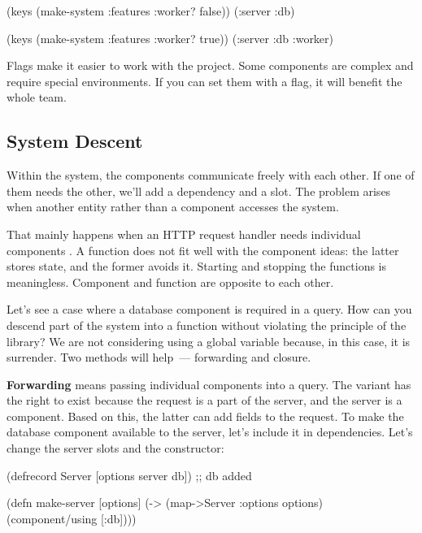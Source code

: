 \else

\begin{english}
  \begin{clojure}
(keys (make-system {:features {:worker? false}}))
(:server :db)

(keys (make-system {:features {:worker? true}}))
(:server :db :worker)
  \end{clojure}
\end{english}

\fi

Flags make it easier to work with the project. Some components are complex and require special environments. If you can set them with a flag, it will benefit the whole team.

\subsection{System Descent}


Within the system, the components communicate freely with each other. If one of them needs the other, we'll add a dependency and a slot. The problem arises when another entity rather than a component accesses the system.

That mainly happens when an HTTP request handler needs individual components . A function does not fit well with the component ideas: the latter stores state, and the former avoids it. Starting and stopping the functions is meaningless. Component and function are opposite to each other.

Let's see a case where a database component is required in a query. How can you descend part of the system into a function without violating the principle of the library? We are not considering using a global variable because, in this case, it is surrender. Two methods will help~--- forwarding and closure.


\textbf{Forwarding} means passing individual components into a query. The variant has the right to exist because the request is a part of the server, and the server is a component. Based on this, the latter can add fields to the request. To make the database component available to the server, let's include it in dependencies. Let's change the server slots and the constructor:

\begin{english}
  \begin{clojure}
(defrecord Server
  [options server db]) ;; db added

(defn make-server
  [options]
  (-> (map->Server {:options options})
      (component/using [:db])))
  \end{clojure}
\end{english}

